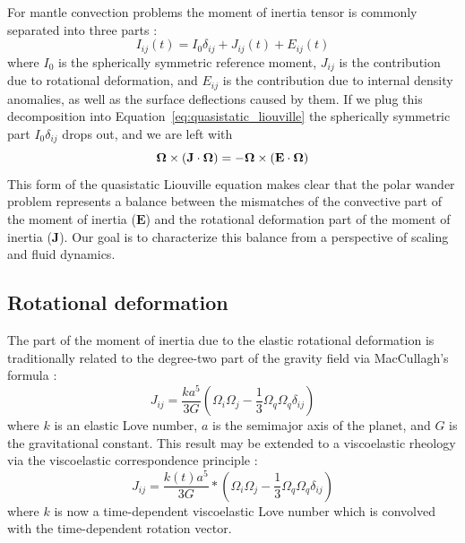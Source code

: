 \documentclass[extra,mreferee]{gji}
\begin{document}
For mantle convection problems the moment of inertia tensor is commonly separated into three parts \citep{ricard1993polar}:
\begin{equation}
I_{ij}(t) = I_0 \delta_{ij} + J_{ij}(t) + E_{ij}(t)
\label{eq:separation}
\end{equation}
where $I_0$ is the spherically symmetric reference moment, $J_{ij}$ is the contribution due to rotational deformation, and $E_{ij}$ is the contribution due to internal density anomalies, as well as the surface deflections caused by them.
If we plug this decomposition into Equation~\eqref{eq:quasistatic_liouville} the spherically symmetric part $I_0 \delta_{ij}$ drops out, and we are left with
\begin{equation}
\mathbf{\Omega} \times (\mathbf{J} \cdot \mitbf{\Omega}) = -\mitbf{\Omega} \times ( \mathbf{E} \cdot \mitbf{\Omega} )
\label{eq:disequilibrium}
\end{equation}
This form of the quasistatic Liouville equation makes clear that the polar wander problem represents a balance between the mismatches
of the convective part of the moment of inertia ($\mathbf{E}$) and the rotational deformation part of the moment of inertia ($\mathbf{J}$).
Our goal is to characterize this balance from a perspective of scaling and fluid dynamics.

\subsection{Rotational deformation}
\label{sec:rotational_deformation}

The part of the moment of inertia due to the elastic rotational deformation is traditionally related to the degree-two part of the gravity field via MacCullagh's formula \citep{munk1960rotation}:
\begin{equation}
J_{ij} = \frac{k a^5}{3 G} \left( \Omega_i \Omega_j - \frac{1}{3} \Omega_q \Omega_q \delta_{ij} \right)
\label{eq:elastic_deformation}
\end{equation}
where $k$ is an elastic Love number, $a$ is the semimajor axis of the planet, and $G$ is the gravitational constant.
This result may be extended to a viscoelastic rheology via the viscoelastic correspondence principle \citep[e.g.][]{peltier1974impulse}:
\begin{equation}
J_{ij} = \frac{k(t) a^5}{3 G} * \left( \Omega_i \Omega_j - \frac{1}{3} \Omega_q \Omega_q \delta_{ij} \right)
\label{eq:viscoelastic_deformation}
\end{equation}
where $k$ is now a time-dependent viscoelastic Love number which is convolved with the time-dependent rotation vector.
\end{document}
